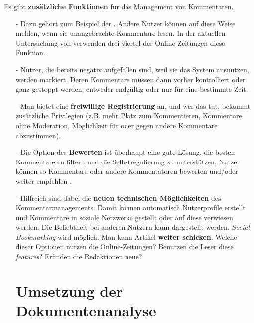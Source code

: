 Es gibt {\bfseries zusätzliche  Funktionen} für das Management von Kommentaren.

\begin{itemize}

  \item[-] Dazu gehört zum Beispiel der  \grqq{} \autocite[S.~110f]{reich}. Andere Nutzer können auf
    diese Weise melden, wenn sie unangebrachte Kommentare lesen. In der
    aktuellen Untersuchung von \textcite[S.~63]{singer:2014} verwenden drei
    viertel der Online-Zeitungen diese Funktion.

  \item[-] Nutzer, die bereits negativ aufgefallen sind, weil sie das System
    ausnutzen, werden markiert. Deren Kommentare müssen dann vorher kontrolliert
    oder ganz gestoppt werden, entweder endgültig oder nur für eine bestimmte
    Zeit.

  \item[-] Man bietet eine  {\bfseries freiwillige Registrierung} an, und wer
    das tut, bekommt zusätzliche Privilegien (z.B. mehr Platz zum Kommentieren,
    Kommentare ohne Moderation, Möglichkeit für oder gegen andere Kommentare
    abzustimmen).

  \item[-] Die Option des {\bfseries \glqq Bewerten\grqq} ist überhaupt eine
    gute Lösung, die besten Kommentare zu filtern und die Selbstregulierung zu
    unterstützen. Nutzer können so Kommentare oder andere Kommentatoren bewerten
    und/oder weiter empfehlen \autocite[S.~63f]{singer:2014}.

  \item[-] Hilfreich sind dabei die {\bfseries neuen technischen Möglichkeiten}
    des Kommentarmanagements. Damit können automatisch Nutzerprofile erstellt
    und Kommentare in soziale Netzwerke gestellt oder auf diese verwiesen
    werden. Die Beliebtheit bei anderen Nutzern kann dargestellt werden.
    {\slshape Social Bookmarking} wird möglich. Man kann Artikel {\bfseries
    weiter schicken}. Welche dieser Optionen nutzen die Online-Zeitungen?
    Benutzen die Leser diese {\slshape features}? Erfinden die Redaktionen neue?

    

\section{Umsetzung der Dokumentenanalyse}
    

\end{itemize}
